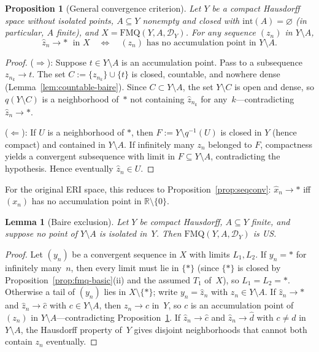 \documentclass[11pt]{article}
\newtheorem{lemma}[theorem]{Lemma}
\newtheorem{proposition}[theorem]{Proposition}
\theoremstyle{definition}
\theoremstyle{remark}
\begin{document}
\begin{proposition}[General convergence criterion]\label{prop:gen-conv}
Let $Y$ be a compact Hausdorff space without isolated points,
$A \subseteq Y$ nonempty and closed with $\mathrm{int}(A) = \varnothing$
\textup{(}in particular, $A$ finite\textup{)}, and
$X = \mathrm{FMQ}(Y, A, \mathcal{D}_Y)$.
For any sequence $(z_n)$ in $Y \setminus A$,
\[
\hat{z}_n \to \ast \;\text{ in } X
\quad\Longleftrightarrow\quad
(z_n) \text{ has no accumulation point in } Y \setminus A.
\]
\end{proposition}

\begin{proof}
($\Rightarrow$): Suppose $t \in Y \setminus A$ is an accumulation
point. Pass to a subsequence $z_{n_k} \to t$.
The set $C := \{z_{n_k}\} \cup \{t\}$ is closed, countable,
and nowhere dense (Lemma~\ref{lem:countable-baire}).
Since $C \subset Y \setminus A$, the set $Y \setminus C$ is open
and dense, so $q(Y \setminus C)$ is a neighborhood of~$\ast$
not containing $\hat{z}_{n_k}$ for any~$k$---contradicting
$\hat{z}_n \to \ast$.

($\Leftarrow$): If $U$ is a neighborhood of $\ast$, then
$F := Y \setminus q^{-1}(U)$ is closed in $Y$ (hence compact)
and contained in $Y \setminus A$.
If infinitely many $z_n$ belonged to $F$, compactness yields
a convergent subsequence with limit in $F \subseteq Y \setminus A$,
contradicting the hypothesis.
Hence eventually $\hat{z}_n \in U$.
\end{proof}

For the original ERI space, this reduces to
Proposition~\ref{prop:seqconv}: $\hat{x}_n \to \ast$ iff
$(x_n)$ has no accumulation point in $\mathbb{R}\setminus\{0\}$.

\begin{lemma}[Baire exclusion]\label{lem:baire}
Let $Y$ be compact Hausdorff, $A \subseteq Y$ finite, and suppose no point of
$Y \setminus A$ is isolated in~$Y$. Then $\mathrm{FMQ}(Y, A, \mathcal{D}_Y)$ is US.
\end{lemma}

\begin{proof}
Let $(y_n)$ be a convergent sequence in $X$ with limits $L_1, L_2$.
If $y_n = \ast$ for infinitely many~$n$, then every limit must lie
in $\{\ast\}$ (since $\{\ast\}$ is closed by
Proposition~\ref{prop:fmq-basic}(ii) and the assumed $T_1$ of~$X$),
so $L_1 = L_2 = \ast$.
Otherwise a tail of $(y_n)$ lies in $X \setminus \{\ast\}$; write
$y_n = \hat{z}_n$ with $z_n \in Y \setminus A$.
If $\hat{z}_n \to \ast$ and $\hat{z}_n \to \hat{c}$ with
$c \in Y \setminus A$, then $z_n \to c$ in~$Y$, so $c$ is an
accumulation point of $(z_n)$ in $Y \setminus A$---contradicting
Proposition~\ref{prop:gen-conv}.
If $\hat{z}_n \to \hat{c}$ and $\hat{z}_n \to \hat{d}$ with
$c \neq d$ in $Y \setminus A$, the Hausdorff property of~$Y$ gives
disjoint neighborhoods that cannot both contain $z_n$ eventually.
\end{proof}
\end{document}
